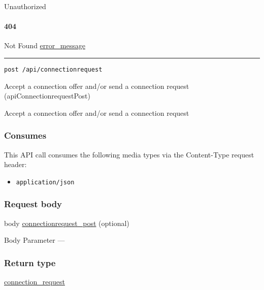 Unauthorized \protect\hyperlink{}{}

\hypertarget{section-14}{%
\paragraph{404}\label{section-14}}

Not Found \protect\hyperlink{error_message}{error\_message}

\begin{center}\rule{0.5\linewidth}{\linethickness}\end{center}

\protect\hypertarget{apiConnectionrequestPost}{}{}

\begin{verbatim}
post /api/connectionrequest
\end{verbatim}

Accept a connection offer and/or send a connection request
({apiConnectionrequestPost})

Accept a connection offer and/or send a connection request

\hypertarget{consumes}{%
\subsubsection{Consumes}\label{consumes}}

This API call consumes the following media types via the {Content-Type}
request header:

\begin{itemize}
\tightlist
\item
  \texttt{application/json}
\end{itemize}

\hypertarget{request-body}{%
\subsubsection{Request body}\label{request-body}}

body \protect\hyperlink{connectionrequest_post}{connectionrequest\_post}
(optional)

{Body Parameter} ---

\hypertarget{return-type-3}{%
\subsubsection{Return type}\label{return-type-3}}

\protect\hyperlink{connection_request}{connection\_request}

